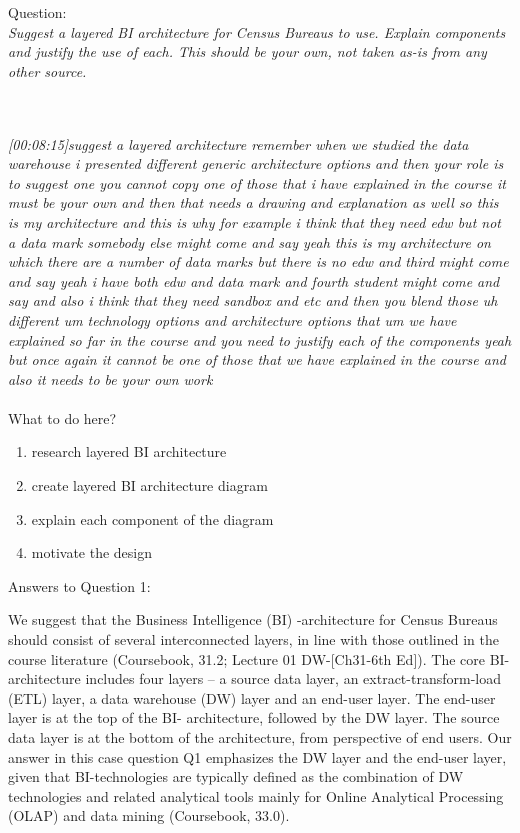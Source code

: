 Question:\\
\emph{Suggest a layered BI architecture for Census Bureaus to use. Explain components and
justify the use of each. This should be your own, not taken as-is from any other source.}

\\\\
\emph{[00:08:15]suggest a layered architecture remember when we studied the data warehouse i presented
different generic architecture options and then your role is to suggest one you cannot copy one of those that i have explained in the course it must be your own
and then that needs a drawing and explanation as well so this is my architecture and this is why for example
i think that they need edw but not a data mark somebody else might come and say
yeah this is my architecture on which there are a number of data marks but there is no edw and third might come
and say yeah i have both edw and data mark and fourth student might come and say and also i think that they need sandbox and etc and then you blend those
uh different um technology options and architecture options that um we have explained so far in the course and you need to justify each of the components
yeah but once again it cannot be one of those that we have explained in the course and also it needs to be your own work}\\\\
What to do here?
\begin{enumerate}
    \item research layered BI architecture
    \item create layered BI architecture diagram
    \item explain each component of the diagram
    \item motivate the design
  \end{enumerate}

\newpage Answers to Question 1:

We suggest that the Business Intelligence (BI) -architecture for Census Bureaus should consist of several interconnected layers, in line with those outlined in the course literature (Coursebook, 31.2; Lecture 01 DW-[Ch31-6th Ed]). The core BI-architecture includes four layers – a source data layer, an extract-transform-load (ETL) layer, a data warehouse (DW) layer and an end-user layer. The end-user layer is at the top of the BI- architecture, followed by the DW layer. The source data layer is at the bottom of the architecture, from perspective of end users. Our answer in this case question Q1 emphasizes the DW layer and the end-user layer, given that BI-technologies are typically defined as the combination of DW technologies and related analytical tools mainly for Online Analytical Processing (OLAP) and data mining (Coursebook, 33.0).  


